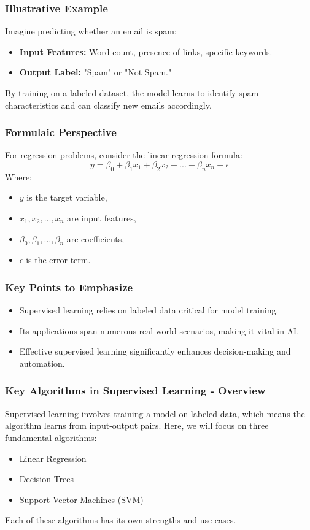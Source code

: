\documentclass{beamer}
\begin{document}
\begin{frame}[fragile]
    \frametitle{Illustrative Example}
    Imagine predicting whether an email is spam:
    \begin{itemize}
        \item \textbf{Input Features:} Word count, presence of links, specific keywords.
        \item \textbf{Output Label:} "Spam" or "Not Spam."
    \end{itemize}
    By training on a labeled dataset, the model learns to identify spam characteristics and can classify new emails accordingly.
\end{frame}

\begin{frame}[fragile]
    \frametitle{Formulaic Perspective}
    For regression problems, consider the linear regression formula:
    \begin{equation}
        y = \beta_0 + \beta_1x_1 + \beta_2x_2 + ... + \beta_nx_n + \epsilon 
    \end{equation}
    Where:
    \begin{itemize}
        \item $y$ is the target variable,
        \item $x_1, x_2,\ldots, x_n$ are input features,
        \item $\beta_0, \beta_1, \ldots, \beta_n$ are coefficients,
        \item $\epsilon$ is the error term.
    \end{itemize}
\end{frame}

\begin{frame}[fragile]
    \frametitle{Key Points to Emphasize}
    \begin{itemize}
        \item Supervised learning relies on labeled data critical for model training.
        \item Its applications span numerous real-world scenarios, making it vital in AI.
        \item Effective supervised learning significantly enhances decision-making and automation.
    \end{itemize}
\end{frame}

\begin{frame}[fragile]
    \frametitle{Key Algorithms in Supervised Learning - Overview}
    Supervised learning involves training a model on labeled data, which means the algorithm learns from input-output pairs. 
    Here, we will focus on three fundamental algorithms: 
    \begin{itemize}
        \item Linear Regression
        \item Decision Trees
        \item Support Vector Machines (SVM)
    \end{itemize}
    Each of these algorithms has its own strengths and use cases.
\end{frame}
\end{document}
